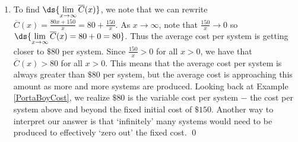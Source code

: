 \documentclass{ximera}
\begin{document}
\begin{example}
\begin{enumerate}
\begin{image}
\end{image}

In the context of the problem, $x$ represents the number of PortaBoy games systems produced and $\overline{C}(x)$ is the average cost to produce each system.  Solving $\overline{C}(x) < 100$ means we are trying to find how many systems we need to produce so that the average cost is less than $\$100$ per system.  Our solution, $(7.5, \infty)$ tells us that we need to produce more than $7.5$ systems to achieve this.  Since it doesn't make sense to produce half a system, our final answer is $[8, \infty)$.

\item  To find $\ds{\lim_{x \rightarrow \infty} \overline{C}(x)}$, we note that we can rewrite $\overline{C}(x) = \frac{80x+150}{x}  =  80 + \frac{150}{x}$.    As $x \rightarrow \infty$, note that $\frac{150}{x} \rightarrow 0$ so $\ds{\lim_{x \rightarrow \infty} \overline{C}(x) = 80 + 0 = 80}$.   Thus the average cost per system is getting closer to $\$ 80$ per system. Since  $\frac{150}{x} > 0$ for all $x>0$,  we have that  $\overline{C}(x) > 80$ for all $x > 0$.  This means that the average cost per system is always greater than $\$ 80$ per system, but the average cost is approaching this amount as more and more systems are produced.  Looking back at Example \ref{PortaBoyCost}, we realize $\$ 80$ is the variable cost per system $-$ the cost per system above and beyond the fixed initial cost of $\$150$.  Another way to interpret our answer is that `infinitely' many systems would need to be produced to effectively `zero out'  the fixed cost. \qed



\end{enumerate}

\end{example}
\end{document}

